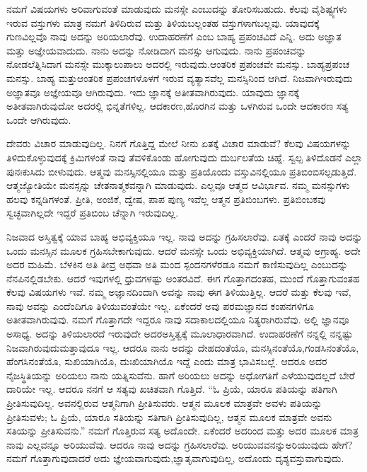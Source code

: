 ನಮಗೆ ವಿಷಯಗಳು ಅರಿವಾಗುವಂತೆ ಮಾಡುವುದು ಮನಸ್ಸೇ ಎಂಬುದನ್ನು ತೋರಿಸಬಹುದು. ಕೆಲವು ವೈಶಿಷ್ಟ್ಯಗಳು ಇರುವ ವಸ್ತುಗಳು ಮಾತ್ರ ನಮಗೆ ತಿಳಿದಿರುವ ಮತ್ತು ತಿಳಿಯಬಲ್ಲಂತಹ ವಸ್ತುಗಳಾಗಬಲ್ಲವು. ಯಾವುದಕ್ಕೆ ಗುಣವಿಲ್ಲವೊ ನಾವು ಅದನ್ನು ಅರಿಯಲಾರೆವು. ಉದಾಹರಣೆಗೆ  ಎಂಬ ಬಾಹ್ಯ ಪ್ರಪಂಚವಿದೆ ಎನ್ನಿ. ಅದು ಅಜ್ಞಾತ ಮತ್ತು ಅಜ್ಞೇಯವಾದುದು. ನಾನು ಅದನ್ನು ನೋಡಿದಾಗ  ಮನಸ್ಸು ಆಗುವುದು. ನಾನು ಪ್ರಪಂಚವನ್ನು ನೋಡಲೆತ್ನಿಸಿದಾಗ ಮನಸ್ಸೇ ಮುಕ್ಕಾಲುಪಾಲು ಅದರಲ್ಲಿ ಇರುವುದು.\break ಆಂತರಿಕ ಪ್ರಪಂಚವೇ  ಮನಸ್ಸು. ಬಾಹ್ಯಪ್ರಪಂಚ  ಮನಸ್ಸು. ಬಾಹ್ಯ ಮತ್ತು\break ಆಂತರಿಕ ಪ್ರಪಂಚಗಳೊಳಗೆ ಇರುವ ವ್ಯತ್ಯಾಸವೆಲ್ಲ ಮನಸ್ಸಿನಿಂದ ಆಗಿದೆ. ನಿಜವಾಗಿ\break ಇರುವುದು ಅಜ್ಞಾತವೂ ಅಜ್ಞೇಯವೂ ಆಗಿರುವುದು. ಇದು ಜ್ಞಾನಕ್ಕೆ ಅತೀತವಾಗಿರುವುದು. ಯಾವುದು ಜ್ಞಾನಕ್ಕೆ ಅತೀತವಾಗಿರುವುದೋ ಅದರಲ್ಲಿ ಭಿನ್ನತೆಗಳಿಲ್ಲ. ಆದಕಾರಣ,\break ಹೊರಗಿನ  ಮತ್ತು  ಒಳಗಿರುವ ಒಂದೇ ಆದಕಾರಣ ಸತ್ಯ ಒಂದೇ ಆಗಿರುವುದು.

ದೇವರು ವಿಚಾರ ಮಾಡುವುದಿಲ್ಲ. ನಿನಗೆ ಗೊತ್ತಿದ್ದ ಮೇಲೆ ನೀನು ಏತಕ್ಕೆ ವಿಚಾರ ಮಾಡುವೆ? ಕೆಲವು ವಿಷಯಗಳನ್ನು ತಿಳಿದುಕೊಳ್ಳುವುದಕ್ಕೆ ಕ್ರಿಮಿಗಳಂತೆ ನಾವು ತೆವಳಿಕೊಂಡು ಹೋಗುವುದು ದುರ್ಬಲತೆಯ ಚಿಹ್ನೆ. ಸ್ವಲ್ಪ ತಿಳಿದೊಡನೆ ಎಲ್ಲಾ ಪುನಃ\break ಕುಸಿದು ಬೀಳುವುದು. ಆತ್ಮವು ಮನಸ್ಸಿನಲ್ಲಿಯೂ ಮತ್ತು ಪ್ರತಿಯೊಂದು ವಸ್ತುವಿನಲ್ಲಿಯೂ ಪ್ರತಿಬಿಂಬಿಸಲ್ಪಡುತ್ತಿದೆ. ಆತ್ಮಜ್ಯೋತಿಯೇ ಮನಸ್ಸನ್ನು ಚೇತನಾತ್ಮಕವನ್ನಾಗಿ ಮಾಡುವುದು. ಎಲ್ಲವೂ ಆತ್ಮದ ಆವಿರ್ಭಾವ. ನಮ್ಮ ಮನಸ್ಸುಗಳು ಹಲವು ಕನ್ನಡಿಗಳಂತೆ. ಪ್ರೀತಿ, ಅಂಜಿಕೆ, ದ್ವೇಷ, ಪಾಪ ಪುಣ್ಯ ಇವೆಲ್ಲ ಆತ್ಮನ ಪ್ರತಿಬಿಂಬಗಳು. ಪ್ರತಿಬಿಂಬಕವು ಸ್ವಚ್ಛವಾಗಿಲ್ಲದೇ ಇದ್ದರೆ ಪ್ರತಿಬಿಂಬ ಚೆನ್ನಾಗಿ ಇರುವುದಿಲ್ಲ.

ನಿಜವಾದ ಅಸ್ತಿತ್ವಕ್ಕೆ ಯಾವ ಬಾಹ್ಯ ಅಭಿವ್ಯಕ್ತಿಯೂ ಇಲ್ಲ. ನಾವು ಅದನ್ನು ಗ್ರಹಿಸಲಾರೆವು. ಏತಕ್ಕೆ ಎಂದರೆ ನಾವು ಅದನ್ನು ಒಂದು ಮನಸ್ಸಿನ ಮೂಲಕ ಗ್ರಹಿಸಬೇಕಾಗುವುದು. ಆದರೆ ಮನಸ್ಸೇ ಒಂದು ಅಭಿವ್ಯಕ್ತಿಯಾಗಿದೆ. ಆತ್ಮವು ಅಗ್ರಾಹ್ಯ. ಅದೇ ಅದರ ಮಹಿಮೆ. ಬೆಳಕಿನ ಅತಿ ತೀವ್ರ ಅಥವಾ ಅತಿ ಮಂದ ಸ್ಪಂದನಗಳೆರಡೂ ನಮಗೆ ಕಾಣಿಸುವುದಿಲ್ಲ ಎಂಬುದನ್ನು ನೆನಪಿನಲ್ಲಿಡಬೇಕು. ಆದರೆ ಇವುಗಳಲ್ಲಿ ಧ್ರುವಗಳಷ್ಟು ಅಂತರವಿದೆ. ಈಗ ಗೊತ್ತಾಗದಂತಹ, ಮುಂದೆ ಗೊತ್ತಾಗುವಂತಹ ಕೆಲವು ವಿಷಯಗಳು ಇವೆ. ನಮ್ಮ ಅಜ್ಞಾನದಿಂದಾಗಿ ಅವನ್ನು ನಾವು ಈಗ ತಿಳಿಯುತ್ತಿಲ್ಲ. ಆದರೆ ಮತ್ತು ಕೆಲವು ಇವೆ, ನಾವು ಅವನ್ನು ಎಂದೆಂದಿಗೂ ತಿಳಿಯುವಂತೆಯೇ ಇಲ್ಲ. ಏಕೆಂದರೆ ಅವು ಪರಮಜ್ಞಾನದ ಕಂಪನಗಳಿಗೂ ಅತೀತವಾಗಿರುವುವು. ನಮಗೆ ಗೊತ್ತಾಗದೇ ಇದ್ದರೂ ನಾವು ಸದಾಕಾಲದಲ್ಲಿಯೂ ನಿತ್ಯರಾಗಿರುವೆವು. ಅಲ್ಲಿ ಜ್ಞಾನವೂ ಅಸಾಧ್ಯ. ಅದನ್ನು ತಿಳಿಯಲಾರದೆ ಇರುವುದೇ ಅದರ\break ಅಸ್ತಿತ್ವಕ್ಕೆ ಮೂಲಾಧಾರವಾಗಿದೆ. ಉದಾಹರಣೆಗೆ ನನ್ನಲ್ಲಿ ನನ್ನಷ್ಟು ನಿಜವಾಗಿರುವುದು\break ಮತ್ತಾವುದೂ ಇಲ್ಲ. ಆದರೂ ನಾನು ಅದನ್ನು ದೇಹದಂತೆಯೊ, ಮನಸ್ಸಿನಂತೆಯೊ,\break ಗಂಡಸಿನಂತೆಯೊ, ಹೆಂಗಸಿನಂತೆಯೊ, ಸುಖಿಯಾಗಿಯೊ, ದುಃಖಿಯಾಗಿಯೊ ಇದ್ದೆ ಎಂದು ಮಾತ್ರ ಭಾವಿಸಬಲ್ಲೆ. ಆದರೂ ಅದರ ನೈಜಸ್ಥಿತಿಯನ್ನು ಅರಿಯಲು ನಾನು ಯತ್ನಿಸುವೆನು. ಹಾಗೆ ಅರಿಯಲು ಅದನ್ನು ಅಧೋಗತಿಗೆ ಎಳೆಯುವುದಲ್ಲದೆ ಬೇರೆ ದಾರಿಯೇ ಇಲ್ಲ. ಆದರೂ ನನಗೆ ಆ ಸತ್ಯವು ಖಚಿತವಾಗಿ ಗೊತ್ತಿದೆ. “ಓ ಪ್ರಿಯೆ, ಯಾರೂ ಪತಿಯನ್ನು ಪತಿಗಾಗಿ ಪ್ರೀತಿಸುವುದಿಲ್ಲ. ಅವನಲ್ಲಿರುವ ಆತ್ಮನಿಗಾಗಿ ಪ್ರೀತಿಸುವರು. ಆತ್ಮನ ಮೂಲಕ ಮಾತ್ರವೇ ಅವಳು ಪತಿಯನ್ನು ಪ್ರೀತಿಸುವಳು; ಓ ಪ್ರಿಯೆ, ಯಾರೂ ಸತಿಯನ್ನು ಸತಿಗಾಗಿ ಪ್ರೀತಿಸುವುದಿಲ್ಲ, ಆತ್ಮನ ಮೂಲಕ ಮಾತ್ರವೇ ಅವನು ಸತಿಯನ್ನು ಪ್ರೀತಿಸುವನು.” ನಮಗೆ ಗೊತ್ತಿರುವ ಸತ್ಯ ಅದೊಂದೇ. ಏಕೆಂದರೆ ಅದರಿಂದ ಮತ್ತು ಅದರ ಮೂಲಕ ಮಾತ್ರ ನಾವು ಎಲ್ಲವನ್ನೂ ಅರಿಯುವೆವು. ಆದರೂ ನಾವು ಅದನ್ನು ಗ್ರಹಿಸಲಾರೆವು. ಅರಿಯುವವನನ್ನು\break ಅರಿಯುವುದು ಹೇಗೆ? ನಮಗೆ ಗೊತ್ತಾಗುವುದಾದರೆ ಅದು ಜ್ಞೇಯವಾಗುವುದು,\break ಜ್ಞಾತೃವಾಗುವುದಿಲ್ಲ, ಅದೊಂದು ದೃಶ್ಯವಸ್ತುವಾಗುವುದು.

